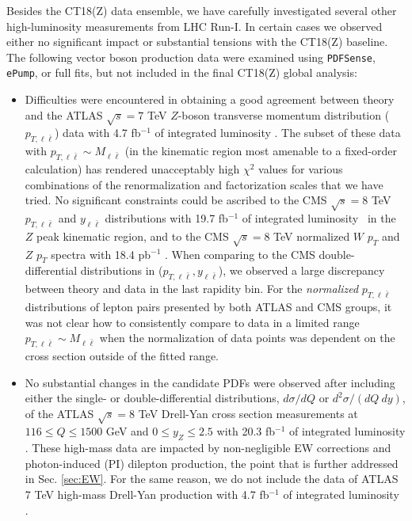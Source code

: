 Besides the CT18(Z) data ensemble, we have carefully investigated several other high-luminosity measurements from LHC Run-I. In certain cases we observed either no significant impact or substantial tensions with the CT18(Z) baseline. The following vector boson production data were examined using {\tt PDFSense}, {\tt ePump}, or full fits, but not included in the final CT18(Z) global analysis:
\begin{itemize}
\item Difficulties were encountered in obtaining a good agreement between theory and the ATLAS $\sqrt{s}=7$ TeV $Z$-boson transverse momentum distribution ($p_{T,  \ell \bar \ell}$) data with 4.7 fb$^{-1}$ of integrated luminosity \cite{Aad:2014xaa}. The subset of these data with $p_{T,  \ell \bar \ell} \sim M_{\ell \bar \ell}$ (in the kinematic region most amenable to a fixed-order calculation) has rendered unacceptably high $\chi^2$ values for various combinations of the renormalization and factorization scales that we have tried. 
No significant constraints could be ascribed to the CMS $\sqrt{s}=8$ TeV $p_{T,  \ell \bar \ell}$ and  $y_{\ell \bar \ell}$ distributions with 19.7 fb$^{-1}$ of integrated luminosity~\cite{Khachatryan:2015oaa} in the
$Z$ peak kinematic region, and to the CMS $\sqrt{s}=8$ TeV normalized $W$ $p_T$ and $Z$ $p_T$ spectra with 18.4 pb$^{-1}$ \cite{Khachatryan:2016nbe}. 
When comparing to the CMS double-differential distributions in ($p_{T,  \ell \bar \ell},y_{\ell \bar \ell}$), we observed a large discrepancy between theory and data in the last rapidity bin.
For the {\it normalized} $p_{T,  \ell \bar \ell}$ distributions of lepton pairs presented by
both ATLAS and  CMS groups, it was not clear how to consistently compare to data in a limited range $p_{T,  \ell \bar \ell} \sim M_{\ell \bar \ell}$ when the normalization of data points was dependent on the cross section outside of the fitted range. 

\item  No substantial changes in the candidate PDFs were observed after including either
the single- or double-differential distributions, $d \sigma/dQ$ or $d^2 \sigma/(dQ\ dy)$, of the ATLAS $\sqrt{s}=8$ TeV Drell-Yan cross section measurements at $116 \leq Q\leq 1500$ GeV and $0 \leq y_Z\leq2.5$ with 20.3 fb$^{-1}$ of integrated luminosity \cite{Aad:2016zzw}. These high-mass data are impacted by non-negligible EW corrections and photon-induced (PI) dilepton production, the point that is further addressed in Sec. \ref{sec:EW}. For the same reason, we do not include the data of ATLAS 7 TeV high-mass Drell-Yan production with 4.7 fb$^{-1}$ of integrated luminosity \cite{Aad:2013iua}.
 



\end{itemize}
